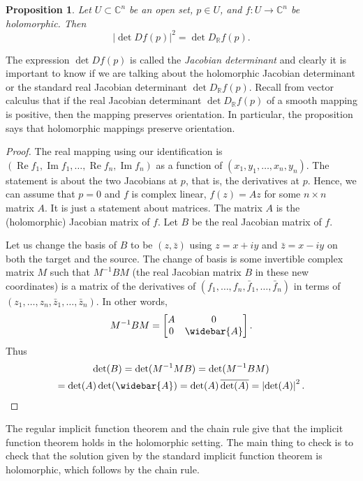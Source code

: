 \documentclass[12pt,openany]{book}
\renewcommand{\Re}{\operatorname{Re}}
\renewcommand{\Im}{\operatorname{Im}}
\newcommand{\abs}[1]{\left\lvert {#1} \right\rvert}
\newcommand{\C}{{\mathbb{C}}}
\newcommand{\R}{{\mathbb{R}}}
\newcommand{\myindex}[1]{#1\index{#1}}
\theoremstyle{plain}
\newtheorem{prop}[thm]{Proposition}
\theoremstyle{remark}
\theoremstyle{definition}
\theoremstyle{exercise}
\theoremstyle{example}
\begin{document}
\begin{prop}
Let $U \subset \C^n$ be an open set, $p \in U$, and 
$f \colon U \to \C^n$ be holomorphic.  Then
\begin{equation*}
\abs{\det D f(p) }^2 = 
\det D_\R f(p) .
\end{equation*}
\end{prop}

The expression $\det D f(p)$ is called the \emph{\myindex{Jacobian
determinant}} and clearly it is important to know if we are talking about
the holomorphic Jacobian determinant or the standard real Jacobian
determinant $\det D_\R f(p)$.  Recall from vector calculus that
if the real Jacobian determinant $\det D_\R
f(p)$ of a smooth mapping is positive, then the mapping preserves
orientation.  In particular, the proposition
says that holomorphic mappings preserve orientation.

\begin{proof}
The real mapping using our identification is
$(\Re f_1,\Im f_1, \ldots, \Re f_n, \Im f_n)$
as a function of $(x_1,y_1,\ldots,x_n,y_n)$.
The statement is about the two Jacobians at $p$, that is, the derivatives
at $p$.  Hence, we can assume that
$p=0$ and $f$ is complex linear, $f(z) = Az$ for some $n \times n$
matrix $A$.  It is just a statement about matrices.
The matrix $A$ is the (holomorphic) Jacobian matrix of $f$.
Let $B$ be the real Jacobian matrix of $f$.

Let us change the basis of $B$ to be $(z,\bar{z})$
using $z = x+iy$ and $\bar{z}=x-iy$
on both the target and the source.
The change of basis is some invertible
complex matrix $M$ such that
$M^{-1} B M$ (the real Jacobian matrix $B$ in these new coordinates)
is a matrix 
of the derivatives of
$(f_1,\ldots,f_n,\bar{f}_1,\ldots,\bar{f}_n)$
in terms of
$(z_1,\ldots,z_n,\bar{z}_1,\ldots,\bar{z}_n)$.
In other words,
\begin{equation*}
M^{-1} B M =
\begin{bmatrix}
A & 0 \\
0 & \widebar{A}
\end{bmatrix} .
\end{equation*}
Thus
\begin{multline*}
\det (B) =
\det(M^{-1}M B)
=
\det(M^{-1} B M)
\\
=
\det(A) \det(\widebar{A})
=
\det(A) \, \overline{\det(A)}
=
\abs{\det(A)}^2 .  \qedhere
\end{multline*}
\end{proof}

The regular implicit function theorem and the chain rule
give that the implicit function theorem holds in the holomorphic setting.
The main thing to check is to check that the solution given by the
standard implicit function theorem is holomorphic, which follows by the
chain rule.
\end{document}

